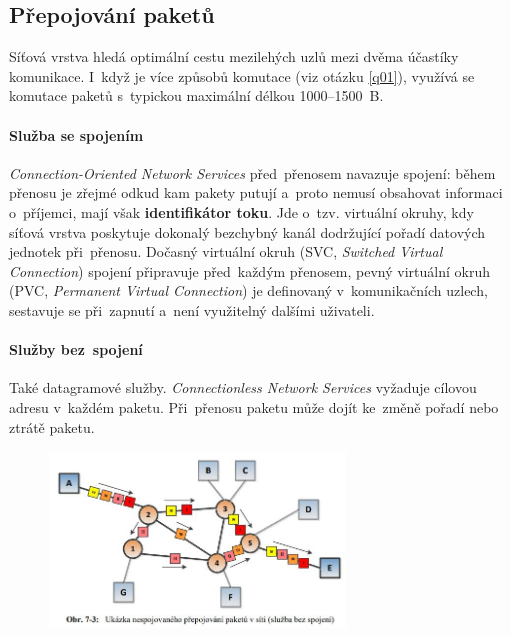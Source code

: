 \subsection{Přepojování paketů}

Síťová vrstva hledá optimální cestu mezilehých uzlů mezi dvěma účastíky komunikace. I~když je více způsobů komutace (viz otázku \ref{q01}), využívá se komutace paketů s~typickou maximální délkou 1000--1500~B.

\paragraph{Služba se spojením} \emph{Connection-Oriented Network Services} před~přenosem navazuje spojení: během přenosu je zřejmé odkud kam pakety putují a~proto nemusí obsahovat informaci o~příjemci, mají však \textbf{identifikátor toku}. Jde o~tzv. virtuální okruhy, kdy síťová vrstva poskytuje dokonalý bezchybný kanál dodržující pořadí datových jednotek při~přenosu. Dočasný virtuální okruh (SVC, \emph{Switched Virtual Connection}) spojení připravuje před~každým přenosem, pevný virtuální okruh (PVC, \emph{Permanent Virtual Connection}) je definovaný v~komunikačních uzlech, sestavuje se při~zapnutí a~není využitelný dalšími uživateli.

\paragraph{Služby bez~spojení} Také datagramové služby. \emph{Connectionless Network Services} vyžaduje cílovou adresu v~každém paketu. Při~přenosu paketu může dojít ke~změně pořadí nebo ztrátě paketu.

\begin{figure}[ht]
	\centering
	\includegraphics[width=0.7\textwidth]{images/q07_connectionless}
\end{figure}


